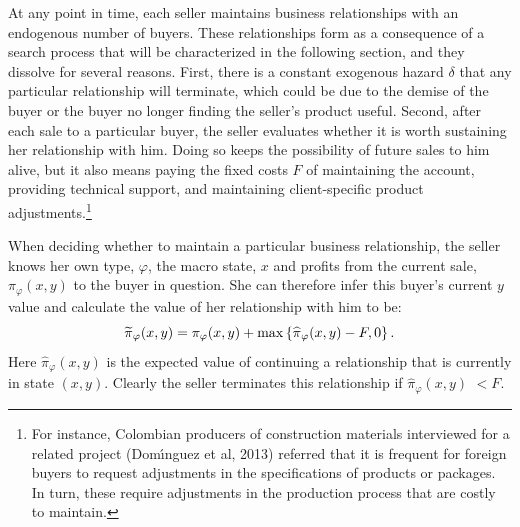 \documentclass[12pt]{article}
\begin{document}
At any point in time, each seller maintains business relationships with an
endogenous number of buyers. These relationships form as a consequence of a
search process that will be characterized in the following section, and they
dissolve for several reasons. First, there is a constant exogenous hazard $%
\delta $ that any particular relationship will terminate, which could be due
to the demise of the buyer or the buyer no longer finding the seller's
product useful. Second, after each sale to a particular buyer, the seller
evaluates whether it is worth sustaining her relationship with him. Doing so
keeps the possibility of future sales to him alive, but it also means paying
the fixed costs $F$ of maintaining the account, providing technical support,
and maintaining client-specific product adjustments.\footnote{%
For instance, Colombian producers of construction materials interviewed for
a related project (Dom\'{\i}nguez et al, 2013) referred that it is frequent
for foreign buyers to request adjustments in the specifications of products
or packages. In turn, these require adjustments in the production process
that are costly to maintain.}

When deciding whether to maintain a particular business relationship, the
seller knows her own type, $\varphi $, the macro state, $x$ and profits from
the current sale, $\pi _{\varphi }(x,y)$ to the buyer in question. She can
therefore infer this buyer's current $y$ value and calculate the value of
her relationship with him to be:%
\begin{equation*}
\widetilde{\pi }_{\varphi }(x,y)=\pi _{\varphi }(x,y)+\max \left\{ \widehat{%
\pi }_{\varphi }(x,y)-F,0\right\} .
\end{equation*}%
Here $\widehat{\pi }_{\varphi }(x,y)$ is the expected value of continuing a
relationship that is currently in state $(x,y).$ Clearly the seller
terminates this relationship if $\widehat{\pi }_{\varphi }(x,y)$ $<F.$
\end{document}

